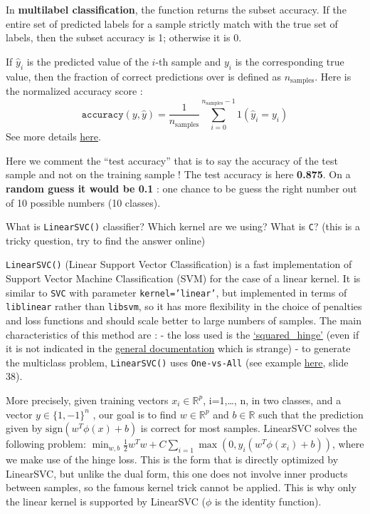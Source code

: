 \documentclass[10pt,a4paper]{article}
\theoremstyle{break}
\begin{document}
In \textbf{multilabel classification}, the function returns the subset accuracy. If the entire set of predicted labels for a sample strictly match with the true set of labels, then the subset accuracy is 1; otherwise it is 0.

If \(\hat{y}_i\) is the predicted value of the \(i\)-th sample and \(y_i\) is the corresponding true value, then the fraction of correct predictions over is defined as \(n_\text{samples}\). Here is the normalized accuracy score :
\[
\texttt{accuracy}(y, \hat{y}) = \frac{1}{n_\text{samples}} \sum_{i=0}^{n_\text{samples}-1} 1(\hat{y}_i = y_i)
\]
See more details \href{https://scikit-learn.org/stable/modules/model_evaluation.html\#accuracy-score}{here}.

Here we comment the ``test accuracy'' that is to say the accuracy of the test sample and not on the training sample ! The test accuracy is here \textbf{0.875}. On a \textbf{random guess it would be 0.1} : one chance to be guess the right number out of 10 possible numbers (10 classes).

\begin{tcolorbox}

What is \texttt{LinearSVC()} classifier? Which kernel are we using? What is \texttt{C}? (this is a tricky question, try to find the answer online)

\end{tcolorbox}

\texttt{LinearSVC()} (Linear Support Vector Classification) is a fast implementation of Support Vector Machine Classification (SVM) for the case of a linear kernel. It is similar to \texttt{SVC} with parameter \texttt{kernel=’linear’}, but implemented in terms of \texttt{liblinear} rather than \texttt{libsvm}, so it has more flexibility in the choice of penalties and loss functions and should scale better to large numbers of samples.
The main characteristics of this method are :
- the loss used is the \href{https://en.wikipedia.org/wiki/Hinge_loss}{`squared\_hinge'} (even if it is not indicated in the \href{https://scikit-learn.org/stable/modules/svm.html\#linearsvc}{general documentation} which is strange)
- to generate the multiclass problem, \texttt{LinearSVC()} uses \texttt{One-vs-All} (see example \href{http://eric.univ-lyon2.fr/~ricco/cours/slides/svm.pdf}{here}, slide 38).

More precisely, given training vectors \(x_i \in \mathbb{R}^p\), i=1,\ldots{}, n, in two classes, and a vector \(y \in \{1, -1\}^n\)
, our goal is to find \(w \in \mathbb{R}^p\) and \(b \in \mathbb{R}\) such that the prediction given by \(\text{sign} (w^T\phi(x) + b)\) is correct for most samples.
LinearSVC solves the following problem:
\(\min_ {w, b} \frac{1}{2} w^T w + C \sum_{i=1}\max(0, y_i (w^T \phi(x_i) + b))\),
where we make use of the hinge loss. This is the form that is directly optimized by LinearSVC, but unlike the dual form, this one does not involve inner products between samples, so the famous kernel trick cannot be applied. This is why only the linear kernel is supported by LinearSVC (\(\phi\) is the identity function).
\end{document}
